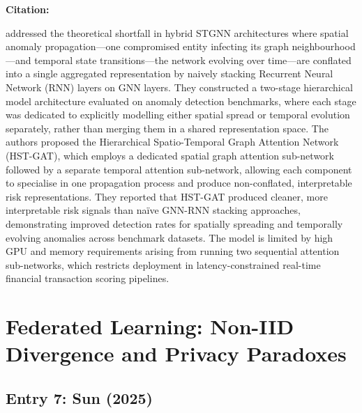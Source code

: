\documentclass[12pt, a4paper]{article}
\newenvironment{surveyentry}[1]{%
  \vspace{6pt}
  \noindent\textbf{\color{navyblue}#1}\par
  \vspace{2pt}
  \noindent\hspace{1em}%
  \begin{minipage}[t]{0.97\linewidth}
}{%
  \end{minipage}
  \vspace{10pt}
}
\begin{document}
\begin{surveyentry}{Citation: \cite{hstgat2025mdpi}}
\cite{hstgat2025mdpi} addressed the theoretical shortfall in hybrid STGNN architectures where spatial anomaly propagation---one compromised entity infecting its graph neighbourhood---and temporal state transitions---the network evolving over time---are conflated into a single aggregated representation by naively stacking Recurrent Neural Network (RNN) layers on GNN layers. They constructed a two-stage hierarchical model architecture evaluated on anomaly detection benchmarks, where each stage was dedicated to explicitly modelling either spatial spread or temporal evolution separately, rather than merging them in a shared representation space. The authors proposed the Hierarchical Spatio-Temporal Graph Attention Network (HST-GAT), which employs a dedicated spatial graph attention sub-network followed by a separate temporal attention sub-network, allowing each component to specialise in one propagation process and produce non-conflated, interpretable risk representations. They reported that HST-GAT produced cleaner, more interpretable risk signals than na\"{i}ve GNN-RNN stacking approaches, demonstrating improved detection rates for spatially spreading and temporally evolving anomalies across benchmark datasets. The model is limited by high GPU and memory requirements arising from running two sequential attention sub-networks, which restricts deployment in latency-constrained real-time financial transaction scoring pipelines.
\end{surveyentry}

\section{Federated Learning: Non-IID Divergence and Privacy Paradoxes}

\subsection*{Entry 7: Sun (2025)}
\end{document}
